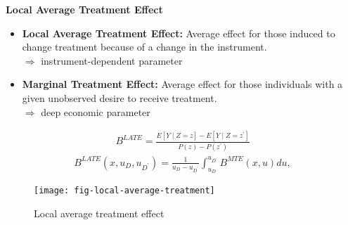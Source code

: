 \begin{frame}\textbf{Local Average Treatment Effect}\vspace{0.3cm}
	\begin{itemize}\setlength\itemsep{1em}
		\item \textbf{Local Average Treatment Effect:} Average effect for those induced
		to change treatment because of a change in the instrument.\\\vspace{0.2cm}
		\(\Rightarrow\) instrument-dependent parameter\vspace{0.4cm}

		\item \textbf{Marginal Treatment Effect:} Average effect for those individuals
		with a given unobserved desire to receive treatment.\\\vspace{0.2cm}
		\(\Rightarrow\) deep economic parameter
	\end{itemize}
\end{frame}
\begin{frame}
	\begin{align*}
		B^{LATE} = \frac{E[Y\mid Z = z] - E[Y \mid Z = z^\prime]}{P(z) - P(z^\prime)}
	\end{align*}
	\begin{align*}
		B^{LATE}(x, u_D, u_{D^\prime}) = \frac{1}{u_D - u_{D^\prime}} \int_{u_D}^{u_{D^\prime}} B^{MTE}(x, u) du,
	\end{align*}
\end{frame}
\begin{frame}
	\begin{figure}[htp]\centering
		\caption{Local average treatment effect}\scalebox{0.35}
		{\texttt{[image: fig-local-average-treatment]}}
	\end{figure}
\end{frame}

